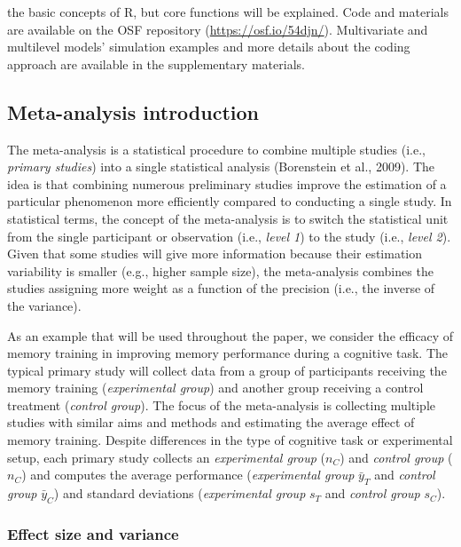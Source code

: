 \documentclass[
  man,floatsintext]{apa6}
\begin{document}
the basic concepts of R, but core functions will be explained. Code and materials are available on the OSF repository (\url{https://osf.io/54djn/}). Multivariate and multilevel models' simulation examples and more details about the coding approach are available in the supplementary materials.

\hypertarget{meta-analysis-introduction}{%
\subsection{Meta-analysis introduction}\label{meta-analysis-introduction}}

The meta-analysis is a statistical procedure to combine multiple studies (i.e., \emph{primary studies}) into a single statistical analysis (Borenstein et al., 2009). The idea is that combining numerous preliminary studies improve the estimation of a particular phenomenon more efficiently compared to conducting a single study. In statistical terms, the concept of the meta-analysis is to switch the statistical unit from the single participant or observation (i.e., \emph{level 1}) to the study (i.e., \emph{level 2}). Given that some studies will give more information because their estimation variability is smaller (e.g., higher sample size), the meta-analysis combines the studies assigning more weight as a function of the precision (i.e., the inverse of the variance).

As an example that will be used throughout the paper, we consider the efficacy of memory training in improving memory performance during a cognitive task. The typical primary study will collect data from a group of participants receiving the memory training (\emph{experimental group}) and another group receiving a control treatment (\emph{control group}). The focus of the meta-analysis is collecting multiple studies with similar aims and methods and estimating the average effect of memory training. Despite differences in the type of cognitive task or experimental setup, each primary study collects an \emph{experimental group} (\(n_{C}\)) and \emph{control group} (\(n_{C}\)) and computes the average performance (\emph{experimental group} \({\bar y}_{T}\) and \emph{control group} \({\bar y}_{C}\)) and standard deviations (\emph{experimental group} \(s_{T}\) and \emph{control group}
\(s_{C}\)).

\hypertarget{effect-size-and-variance}{%
\subsubsection{Effect size and variance}\label{effect-size-and-variance}}
\end{document}
